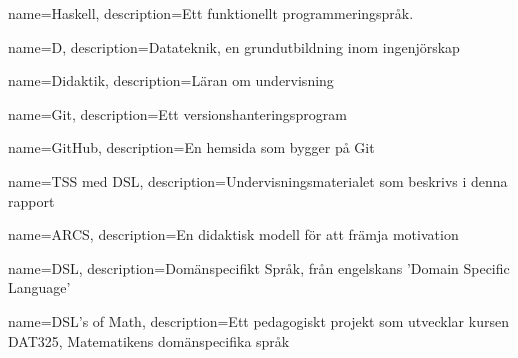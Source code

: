 

{
	name=Haskell,
	description={Ett funktionellt programmeringspråk.}
}

{
    name=D,
    description={Datateknik, en grundutbildning inom ingenjörskap}
}

{
    name=Didaktik,
    description={Läran om undervisning}
}

{
    name=Git,
    description={Ett versionshanteringsprogram}
}

{
    name=GitHub,
    description={En hemsida som bygger på Git}
}

{
    name={TSS med DSL},
    description={Undervisningsmaterialet som beskrivs i denna rapport}
}

{
    name=ARCS,
    description={En didaktisk modell för att främja motivation}
}

{
    name=DSL,
    description={Domänspecifikt Språk, från engelskans 'Domain Specific Language'}
}

{
    name={DSL's of Math},
    description={Ett pedagogiskt projekt som utvecklar kursen DAT325, Matematikens domänspecifika språk}
}






